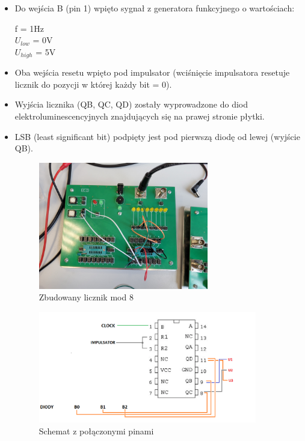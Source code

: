 \begin{itemize}
\begin{figure}[H]
\begin{subfigure}[H]{0.6\textwidth}
                \caption{Schemat logiczny 7493}
            \end{subfigure}
            \label{licznik_mod16:piny_schemat_logiczny}
        \end{figure}
    \item Do wejścia B (pin 1) wpięto sygnał z generatora funkcyjnego o wartościach:
        \begin{center}
            f = 1Hz \\
            $U_{low}$ = 0V \\
            $U_{high}$ = 5V
        \end{center}
    \item Oba wejścia resetu wpięto pod impulsator (wciśnięcie impulsatora resetuje licznik do pozycji w której każdy bit = 0).
    \item Wyjścia licznika (QB, QC, QD) zostały wyprowadzone do diod elektroluminescencyjnych     znajdujących się na prawej stronie płytki.
    \item LSB (least significant bit) podpięty jest pod pierwszą diodę od lewej (wyjście QB).
        \begin{figure}[H]
            \centering
            \includegraphics[width=0.7\textwidth]{img/2/20220608_092500_scaled.png}
            \caption{Zbudowany licznik mod 8}
            \label{licznik_mod8:zbudowany_uklad}
        \end{figure}
        
        \begin{figure}[H]
            \centering
            \includegraphics[width=0.9\textwidth]{img/schemes/schemat_w_pins.png}
            \caption{Schemat z połączonymi pinami}
        \end{figure}
        

\end{itemize}
